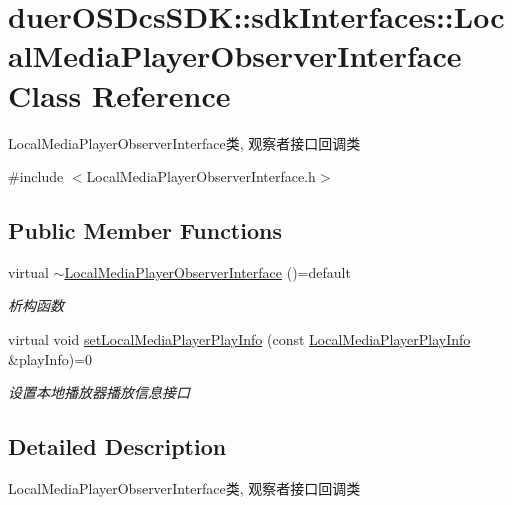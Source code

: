 \hypertarget{classduerOSDcsSDK_1_1sdkInterfaces_1_1LocalMediaPlayerObserverInterface}{}\section{duer\+O\+S\+Dcs\+S\+DK\+:\+:sdk\+Interfaces\+:\+:Local\+Media\+Player\+Observer\+Interface Class Reference}
\label{classduerOSDcsSDK_1_1sdkInterfaces_1_1LocalMediaPlayerObserverInterface}


Local\+Media\+Player\+Observer\+Interface类, 观察者接口回调类  




{\ttfamily \#include $<$Local\+Media\+Player\+Observer\+Interface.\+h$>$}

\subsection*{Public Member Functions}
\begin{DoxyCompactItemize}
\item 
\mbox{\label{classduerOSDcsSDK_1_1sdkInterfaces_1_1LocalMediaPlayerObserverInterface_a3f2b7c693e44a830714fea4f809c1fab}} 
virtual \hyperlink{classduerOSDcsSDK_1_1sdkInterfaces_1_1LocalMediaPlayerObserverInterface_a3f2b7c693e44a830714fea4f809c1fab}{$\sim$\+Local\+Media\+Player\+Observer\+Interface} ()=default
\begin{DoxyCompactList}\small\item\em 析构函数 \end{DoxyCompactList}\item 
virtual void \hyperlink{classduerOSDcsSDK_1_1sdkInterfaces_1_1LocalMediaPlayerObserverInterface_afd784161702cb69aeda0350bd31289a5}{set\+Local\+Media\+Player\+Play\+Info} (const \hyperlink{classduerOSDcsSDK_1_1sdkInterfaces_1_1LocalMediaPlayerPlayInfo}{Local\+Media\+Player\+Play\+Info} \&play\+Info)=0
\begin{DoxyCompactList}\small\item\em 设置本地播放器播放信息接口 \end{DoxyCompactList}\end{DoxyCompactItemize}


\subsection{Detailed Description}
Local\+Media\+Player\+Observer\+Interface类, 观察者接口回调类 

